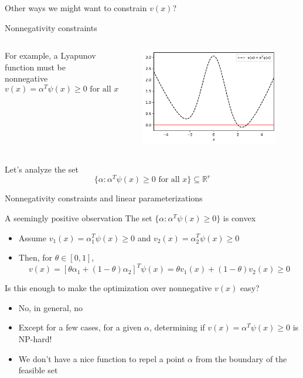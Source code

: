 \documentclass[aspectratio=169]{beamer}
\begin{document}
\begin{frame}{Other ways we might want to constrain $v(x)$?}
\begin{block}{Nonnegativity constraints}
\begin{columns}
For example, a Lyapunov function must be nonnegative
$$
v(x) = \alpha^T \psi(x) \geq 0 \text{ for all } x
$$
\begin{figure}
	\includegraphics[width=\columnwidth]{figures/nonnegative.pdf}
\end{figure}
\end{columns}
\end{block}
Let's analyze the set
$$
\{ \alpha : \alpha^T \psi(x) \geq 0 \text{ for all } x\} \subseteq \mathbb R^r
$$
\end{frame}

\begin{frame}{Nonnegativity constraints and linear parameterizations}
\begin{block}{A seemingly positive observation}
The set $\{ \alpha : \alpha^T \psi(x) \geq 0\}$ is convex
\begin{itemize}
\item
Assume $v_1(x) = \alpha_1^T \psi(x) \geq 0$ and $v_2(x) = \alpha_2^T \psi(x) \geq 0$
\item
Then, for $\theta \in [0, 1]$,
$$
v(x) = [\theta \alpha_1 + (1 - \theta) \alpha_2]^T \psi(x) = \theta v_1(x)  + (1 - \theta) v_2(x)  \geq 0
$$
\end{itemize}
\end{block}
Is this enough to make the optimization over nonnegative $v(x)$ easy?
\begin{itemize}
\item
No, in general, no
\item
Except for a few cases, for a given $\alpha$, determining if $v(x) = \alpha^T \psi(x) \geq 0$ is NP-hard!
\item
We don't have a nice function to repel a point $\alpha$ from the boundary of the feasible set
\end{itemize}
\end{frame}
\end{document}
